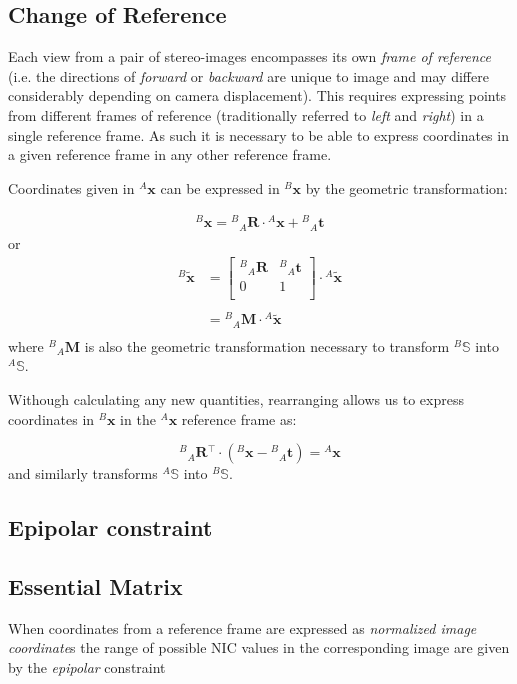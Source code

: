 \documentclass{report}
\newcommand{\tR}[0]{\ensuremath{^{A}}}
\newcommand{\bR}[0]{\ensuremath{_{A}}}
\newcommand{\tL}[0]{\ensuremath{^{B}}}
\newcommand{\tT}[0]{\ensuremath{^{\intercal}}}
\newcommand{\rL}[0]{\ensuremath{{\tL\bR}}}
\newcommand{\xL}[0]{\ensuremath{{\tL\mathbf{x}}}}
\newcommand{\xR}[0]{\ensuremath{{\tR\mathbf{x}}}}
\newcommand{\hxL}[0]{\ensuremath{{\tL\tilde{\mathbf{x}}}}}
\newcommand{\hxR}[0]{\ensuremath{{\tR\tilde{\mathbf{x}}}}}
\newcommand{\rLM}[0]{\ensuremath{{\tL\bR}\mathbf{M}}}
\newcommand{\rLR}[0]{\ensuremath{{\tL\bR}\mathbf{R}}}
\newcommand{\rLt}[0]{\ensuremath{{\tL\bR}\mathbf{t}}}
\newcommand{\sR}[0]{\ensuremath{^{A}\mathbb{S}}}
\newcommand{\sL}[0]{\ensuremath{^{B}\mathbb{S}}}
\begin{document}
\subsection*{Change of Reference}
\par
Each view from a pair of stereo-images encompasses its own \textit{frame of reference} (i.e. the directions of \textit{forward} or \textit{backward} are unique to image and may differe considerably depending on camera displacement).
This requires expressing points from different frames of reference (traditionally referred to \textit{left} and \textit{right}) in a single reference frame. 
As such it is necessary to be able to express coordinates in a given reference frame in any other reference frame.
\par
Coordinates given in $\xR$ can be expressed in $\xL$ by the geometric transformation:
\renewcommand{\arraystretch}{1.5}
\par
\begin{align*}
	\xL = \rLR \cdot \xR + \rLt
\end{align*}
or
\begin{align*}
	\hxL &=
	\left[\begin{array}{c|c}
		\rL\textbf{R} & \rL\textbf{t} \\\hline
		0 & 1 \\
	\end{array}\right]
	\cdot\hxR \\
	&\\
	&= \rLM\cdot\hxR\\
\end{align*}
where $\rLM$ is also the geometric transformation necessary to transform $\sL$ into $\sR$. 
\par
Withough calculating any new quantities, rearranging allows us to express coordinates in $\xL$ in the $\xR$ reference frame as:
\par
\begin{equation*}
	{\rLR\tT}\cdot (\xL - \rLt ) = \xR
\end{equation*}
and similarly transforms $\sR$ into $\sL$.

\subsection*{Epipolar constraint}

\subsection*{Essential Matrix}
\par When coordinates from a reference frame are expressed as \textit{normalized image coordinate}s the range of possible NIC values in the corresponding image are given by the \textit{epipolar} constraint 
\end{document}
